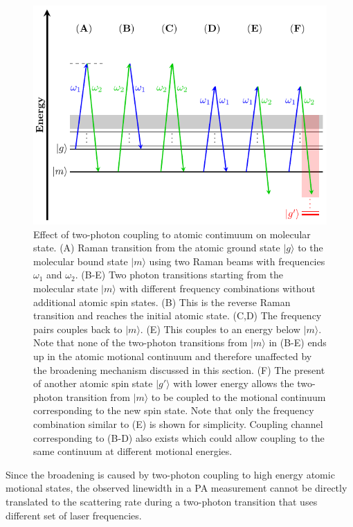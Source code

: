 \begin{figure}
  \centering
  \includegraphics[width=\textwidth]{figures/pa_two_photon_down_raman.pdf}
  \caption[Two-photon transition from molecular state.]{
    Effect of two-photon coupling to atomic contimuum on molecular state.
    (A) Raman transition from the atomic ground state $|g\rangle$
    to the molecular bound state $|m\rangle$ using two Raman beams with frequencies
    $\omega_1$ and $\omega_2$.
    (B-E) Two photon transitions starting from the molecular state $|m\rangle$
    with different frequency combinations without additional atomic spin states.
    (B) This is the reverse Raman transition and reaches the initial atomic state.
    (C,D) The frequency pairs couples back to $|m\rangle$.
    (E) This couples to an energy below $|m\rangle$.
    Note that none of the two-photon transitions from $|m\rangle$ in (B-E) ends up in
    the atomic motional continuum and therefore unaffected by the broadening mechanism
    discussed in this section.
    (F) The present of another atomic spin state $|g'\rangle$ with lower energy
    allows the two-photon transition from $|m\rangle$ to be coupled to the
    motional continuum corresponding to the new spin state.
    Note that only the frequency combination similar to (E) is shown for simplicity.
    Coupling channel corresponding to (B-D) also exists which could allow coupling
    to the same continuum at different motional energies.
    \label{fig:pa:linewidth:two-photon-down-raman}}
\end{figure}

Since the broadening is caused by two-photon coupling to high energy atomic motional states,
the observed linewidth in a PA measurement cannot be directly translated to
the scattering rate during a two-photon transition that uses different set of laser frequencies.

